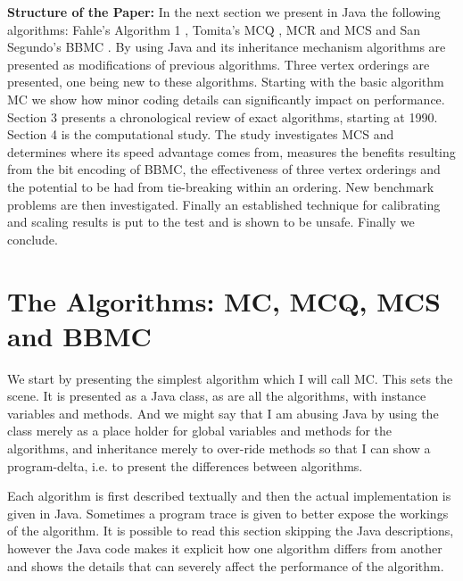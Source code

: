 \documentclass{l4proj}
\begin{document}
\noindent
{\bf Structure of the Paper:}
In the next section we present in Java the following algorithms: Fahle's Algorithm 1 \cite{fahle}, Tomita's MCQ
\cite{tomita2003}, MCR \cite{tomita2007} and MCS \cite{tomita2010} and San Segundo's BBMC \cite{segundo2011}. 
By using Java and its inheritance mechanism algorithms are presented as modifications of previous algorithms.
Three vertex orderings are presented, one being new to these algorithms. Starting with the basic algorithm MC
we show how minor coding details can significantly impact on performance. Section 3 presents a chronological review
of exact algorithms, starting at 1990. Section 4 is the computational study. The study investigates MCS and determines
where its speed advantage comes from, measures the benefits resulting from the bit encoding of BBMC, the
effectiveness of three vertex orderings and the potential to be had from tie-breaking within an ordering. New benchmark
problems are then investigated. Finally an established technique for calibrating and scaling results is put to the test
and is shown to be unsafe. Finally we conclude.

%
\chapter{The Algorithms: MC, MCQ, MCS and BBMC}
\label{sec:algorithms}
We start by presenting the simplest algorithm \cite{fahle} which I will call MC. This sets the scene.
It is presented as a Java class, as are all the algorithms,
with instance variables and methods. And we might say that I am abusing Java by using the class merely as a place holder
for global variables and methods for the algorithms, and inheritance merely to over-ride methods so
that I can show a program-delta, i.e. to present the differences between algorithms. 

Each algorithm is first described textually and then the actual implementation is given in Java. Sometimes a program trace is given to better expose
the workings of the algorithm. It is possible to read this section skipping the Java descriptions, however the Java code
makes it explicit how one algorithm differs from another and shows the details that can severely
affect the performance of the algorithm.
\end{document}
